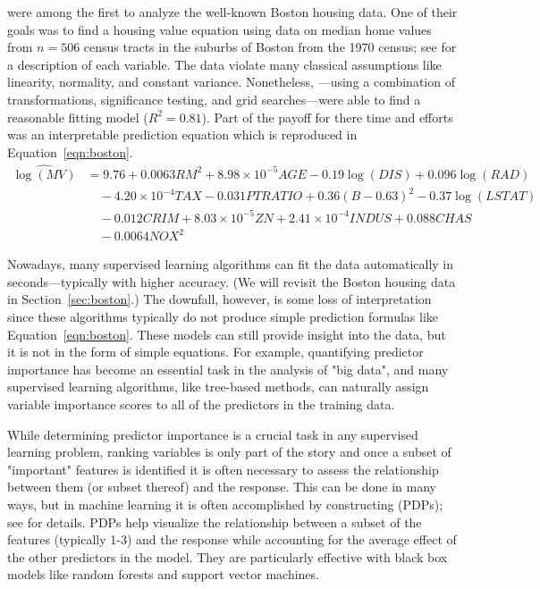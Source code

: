 \citet{harrison-1978-hedonic} were among the first to analyze the well-known Boston housing data. One of their goals was to find a housing value equation using data on median home values from $n = 506$ census tracts in the suburbs of Boston from the 1970 census; see \citet[Table IV]{harrison-1978-hedonic} for a description of each variable. The data violate many classical assumptions like linearity, normality, and constant variance. Nonetheless, \citeauthor{harrison-1978-hedonic}---using a combination of transformations, significance testing, and grid searches---were able to find a reasonable fitting model ($R^2 = 0.81$). Part of the payoff for there time and efforts was an interpretable prediction equation which is reproduced in Equation~\eqref{eqn:boston}.
\begin{equation}
\label{eqn:boston}
\begin{aligned}
\widehat{\log\left(MV\right)} &= 9.76 + 0.0063 RM^2 + 8.98\times10^{-5} AGE - 0.19\log\left(DIS\right) + 0.096\log\left(RAD\right) \\
  & \quad - 4.20\times10^{-4} TAX - 0.031 PTRATIO + 0.36\left(B - 0.63\right)^2 - 0.37\log\left(LSTAT\right) \\
  & \quad - 0.012 CRIM + 8.03\times10^{-5} ZN + 2.41\times10^{-4} INDUS + 0.088 CHAS \\
  & \quad - 0.0064 NOX^2
\end{aligned}
\end{equation}

Nowadays, many supervised learning algorithms can fit the data automatically in seconds---typically with higher accuracy. (We will revisit the Boston housing data in Section~\ref{sec:boston}.) The downfall, however, is some loss of interpretation since these algorithms typically do not produce simple prediction formulas like Equation~\eqref{eqn:boston}. These models can still provide insight into the data, but it is not in the form of simple equations. For example, quantifying predictor importance has become an essential task in the analysis of "big data", and many supervised learning algorithms, like tree-based methods, can naturally assign variable importance scores to all of the predictors in the training data.

While determining predictor importance is a crucial task in any supervised learning problem, ranking variables is only part of the story and once a subset of "important" features is identified it is often necessary to assess the relationship between them (or subset thereof) and the response. This can be done in many ways, but in machine learning it is often accomplished by constructing  (PDPs); see \citet{friedman-2001-greedy} for details. PDPs help visualize the relationship between a subset of the features (typically 1-3) and the response while accounting for the average effect of the other predictors in the model. They are particularly effective with black box models like random forests and support vector machines.

